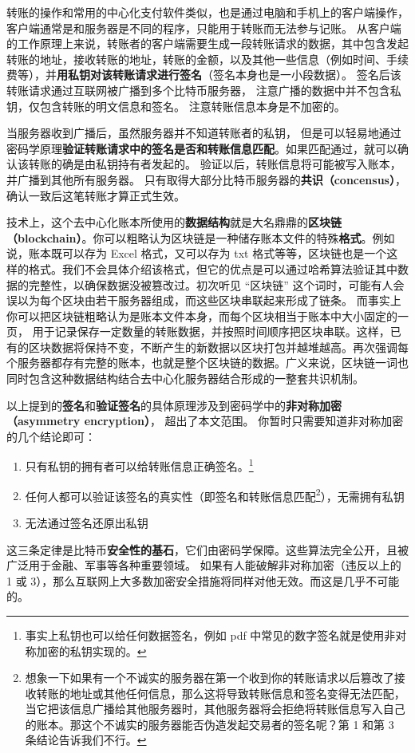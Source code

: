 转账的操作和常用的中心化支付软件类似，也是通过电脑和手机上的客户端操作，客户端通常是和服务器是不同的程序，只能用于转账而无法参与记账。 从客户端的工作原理上来说，转账者的客户端需要生成一段转账请求的数据，其中包含发起转账的地址，接收转账的地址，转账的金额，以及其他一些信息（例如时间、手续费等），并\textbf{用私钥对该转账请求进行签名}（签名本身也是一小段数据）。 签名后该转账请求通过互联网被广播到多个比特币服务器， 注意广播的数据中并不包含私钥，仅包含转账的明文信息和签名。 注意转账信息本身是不加密的。

当服务器收到广播后，虽然服务器并不知道转账者的私钥， 但是可以轻易地通过密码学原理\textbf{验证转账请求中的签名是否和转账信息匹配}。如果匹配通过，就可以确认该转账的确是由私钥持有者发起的。 验证以后，转账信息将可能被写入账本，并广播到其他所有服务器。 只有取得大部分比特币服务器的\textbf{共识（concensus）}， 确认一致后这笔转账才算正式生效。

技术上，这个去中心化账本所使用的\textbf{数据结构}就是大名鼎鼎的\textbf{区块链（blockchain）}。你可以粗略认为区块链是一种储存账本文件的特殊\textbf{格式}。例如说，账本既可以存为 Excel 格式，又可以存为 txt 格式等等，区块链也是一个这样的格式。我们不会具体介绍该格式，但它的优点是可以通过哈希算法验证其中数据的完整性，以确保数据没被篡改过。初次听见 “区块链” 这个词时，可能有人会误以为每个区块由若干服务器组成，而这些区块串联起来形成了链条。 而事实上你可以把区块链粗略认为是账本文件本身，而每个区块相当于账本中大小固定的一页， 用于记录保存一定数量的转账数据，并按照时间顺序把区块串联。这样，已有的区块数据将保持不变，不断产生的新数据以区块打包并越堆越高。再次强调每个服务器都存有完整的账本，也就是整个区块链的数据。广义来说，区块链一词也同时包含这种数据结构结合去中心化服务器结合形成的一整套共识机制。

以上提到的\textbf{签名}和\textbf{验证签名}的具体原理涉及到密码学中的\textbf{非对称加密（asymmetry encryption）}， 超出了本文范围。 你暂时只需要知道非对称加密的几个结论即可：
\begin{enumerate}
\item 只有私钥的拥有者可以给转账信息正确签名。\footnote{事实上私钥也可以给任何数据签名，例如 pdf 中常见的数字签名就是使用非对称加密的私钥实现的。}
\item 任何人都可以验证该签名的真实性（即签名和转账信息匹配\footnote{想象一下如果有一个不诚实的服务器在第一个收到你的转账请求以后篡改了接收转账的地址或其他任何信息，那么这将导致转账信息和签名变得无法匹配，当它把该信息广播给其他服务器时，其他服务器将会拒绝将转账信息写入自己的账本。那这个不诚实的服务器能否伪造发起交易者的签名呢？第 1 和第 3 条结论告诉我们不行。}），无需拥有私钥
\item 无法通过签名还原出私钥
\end{enumerate}
这三条定律是比特币\textbf{安全性的基石}，它们由密码学保障。这些算法完全公开，且被广泛用于金融、军事等各种重要领域。 如果有人能破解非对称加密（违反以上的 1 或 3），那么互联网上大多数加密安全措施将同样对他无效。而这是几乎不可能的。

